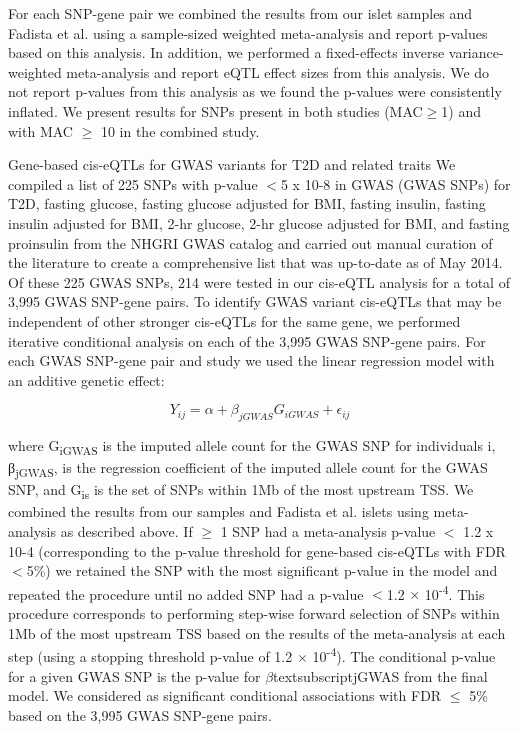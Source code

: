 For each SNP-gene pair we combined the results from our islet samples and Fadista et al. using a sample-sized weighted meta-analysis \cite{willerMETALFastEfficient2010} and report p-values based on this analysis. In addition, we performed a fixed-effects inverse variance-weighted meta-analysis \cite{willerMETALFastEfficient2010} and report eQTL effect sizes from this analysis. We do not report p-values from this analysis as we found the p-values were consistently inflated. We present results for SNPs present in both studies (MAC$\geq$1) and with MAC $\geq$ 10 in the combined study.
 
Gene-based cis-eQTLs for GWAS variants for T2D and related traits
We compiled a list of 225 SNPs with p-value $<$5 x 10-8 in GWAS (GWAS SNPs) for T2D, fasting glucose, fasting glucose adjusted for BMI, fasting insulin, fasting insulin adjusted for BMI, 2-hr glucose, 2-hr glucose adjusted for BMI, and fasting proinsulin from the NHGRI GWAS catalog \cite{welterNHGRIGWASCatalog2014} and carried out manual curation of the literature to create a comprehensive list that was up-to-date as of May 2014. Of these 225 GWAS SNPs, 214 were tested in our cis-eQTL analysis for a total of 3,995 GWAS SNP-gene pairs. To identify GWAS variant cis-eQTLs that may be independent of other stronger cis-eQTLs for the same gene, we performed iterative conditional analysis on each of the 3,995 GWAS SNP-gene pairs. For each GWAS SNP-gene pair and study we used the linear regression model with an additive genetic effect:

\[Y_{ij} = \alpha + \beta_{jGWAS}G_{iGWAS} + \epsilon_{ij} \]


where G\textsubscript{iGWAS} is the imputed allele count for the GWAS SNP for individuals i, β\textsubscript{jGWAS}, is the regression coefficient of the imputed allele count for the GWAS SNP, and G\textsubscript{is} is the set of SNPs within 1Mb of the most upstream TSS. We combined the results from our samples and Fadista et al. islets using meta-analysis as described above.  If $\geq$ 1 SNP had a meta-analysis p-value $<$ 1.2 x 10-4 (corresponding to the p-value threshold for gene-based cis-eQTLs with FDR $<$5\%) we retained the SNP with the most significant p-value in the model and repeated the procedure until no added SNP had a p-value $<$1.2 $\times$ 10\textsuperscript{-4}. This procedure corresponds to performing step-wise forward selection of SNPs within 1Mb of the most upstream TSS based on the results of the meta-analysis at each step (using a stopping threshold p-value of 1.2 $\times$ 10\textsuperscript{-4}). The conditional p-value for a given GWAS SNP is the p-value for $\beta$textsubscript{jGWAS} from the final model. We considered as significant conditional associations with FDR $\leq$ 5\% based on the 3,995 GWAS SNP-gene pairs.

